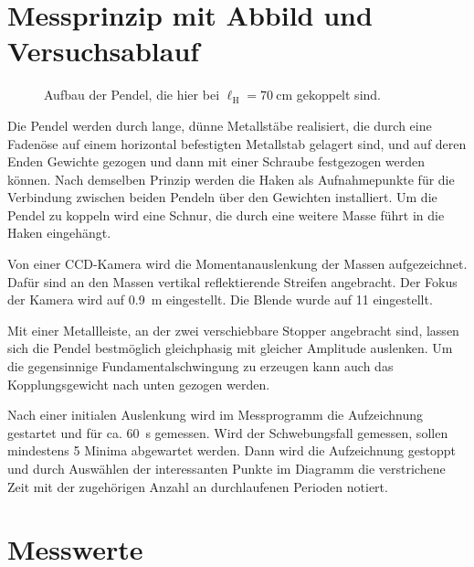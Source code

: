 \documentclass[
12pt,
a4paper,
bibliography=totocnumbered, %
BCOR=1cm, %
oneside, %
]{scrartcl}
\newcommand{\lh}{\ell_{\mathrm{H}}}
\begin{document}
\section[Messprinzip]{Messprinzip mit Abbild und Versuchsablauf}

\begin{figure}[H]
	\caption{Aufbau der Pendel, die hier bei \(\lh = \qty{70}{\centi\meter}\) gekoppelt sind.}
	\label{fig:aufbau}
\end{figure}

Die Pendel werden durch lange, dünne Metallstäbe realisiert, die durch eine Fadenöse auf einem horizontal befestigten Metallstab gelagert sind, und auf deren Enden Gewichte gezogen und dann mit einer Schraube festgezogen werden können. Nach demselben Prinzip werden die Haken als Aufnahmepunkte für die Verbindung zwischen beiden Pendeln über den Gewichten installiert. Um die Pendel zu koppeln wird eine Schnur, die durch eine weitere Masse führt in die Haken eingehängt.

Von einer CCD-Kamera wird die Momentanauslenkung der Massen aufgezeichnet. Dafür sind an den Massen vertikal reflektierende Streifen angebracht. Der Fokus der Kamera wird auf \qty{0,9}{\meter} eingestellt. Die Blende wurde auf \num{11} eingestellt.

Mit einer Metallleiste, an der zwei verschiebbare Stopper angebracht sind, lassen sich die Pendel bestmöglich gleichphasig mit gleicher Amplitude auslenken. Um die gegensinnige Fundamentalschwingung zu erzeugen kann auch das Kopplungsgewicht nach unten gezogen werden.

Nach einer initialen Auslenkung wird im Messprogramm die Aufzeichnung gestartet und für ca. \qty{60}{\second} gemessen. Wird der Schwebungsfall gemessen, sollen mindestens \num{5} Minima abgewartet werden. Dann wird die Aufzeichnung gestoppt und durch Auswählen der interessanten Punkte im Diagramm die verstrichene Zeit mit der zugehörigen Anzahl an durchlaufenen Perioden notiert.



\section{Messwerte}
\end{document}
